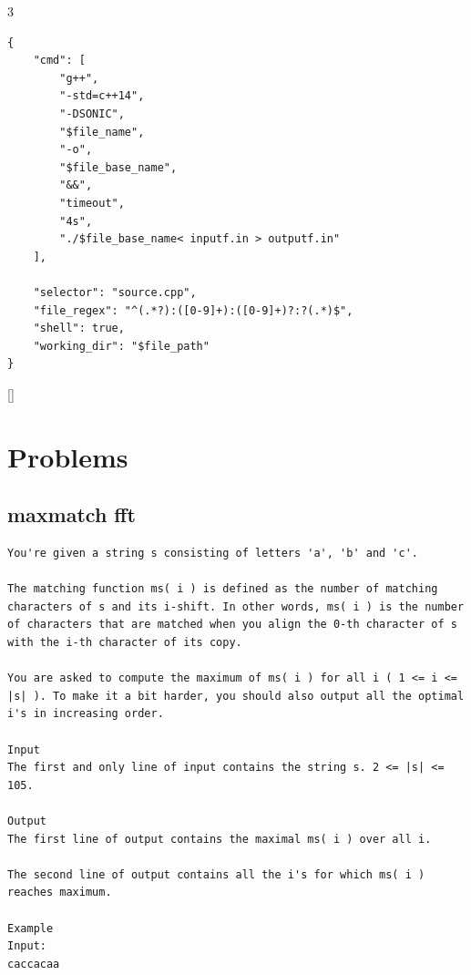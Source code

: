 \documentclass[twoside]{article}
\begin{document}
\begin{multicols*}{3}
\begin{verbatim}
{
    "cmd": [
        "g++",
        "-std=c++14",
        "-DSONIC",
        "$file_name",
        "-o",
        "$file_base_name",
        "&&",
        "timeout",
        "4s",
        "./$file_base_name< inputf.in > outputf.in"
    ],

    "selector": "source.cpp",
    "file_regex": "^(.*?):([0-9]+):([0-9]+)?:?(.*)$",
    "shell": true,
    "working_dir": "$file_path"
}
\end{verbatim}

{
[\vspace{2em}]
\section*{Problems}
}
{
\subsection*{maxmatch fft}
}
\begin{verbatim}
You're given a string s consisting of letters 'a', 'b' and 'c'.

The matching function ms( i ) is defined as the number of matching characters of s and its i-shift. In other words, ms( i ) is the number of characters that are matched when you align the 0-th character of s with the i-th character of its copy.

You are asked to compute the maximum of ms( i ) for all i ( 1 <= i <= |s| ). To make it a bit harder, you should also output all the optimal i's in increasing order.

Input
The first and only line of input contains the string s. 2 <= |s| <= 105.

Output
The first line of output contains the maximal ms( i ) over all i.

The second line of output contains all the i's for which ms( i ) reaches maximum.

Example
Input:
caccacaa


\end{verbatim}
\end{multicols*}
\end{document}
